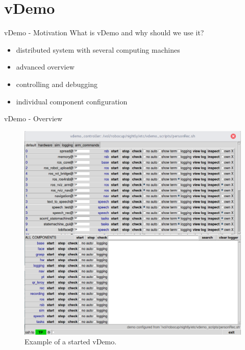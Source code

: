 \section{vDemo}

\begin{frame}[fragile]{vDemo - Motivation}
	\alert{What is vDemo and why should we use it?}
	\begin{itemize}
		\item distributed system with several computing machines
		\item advanced overview %
		\item controlling and debugging %
		\item individual component configuration 
	\end{itemize}
	
	
\end{frame}

\begin{frame}[fragile]{vDemo - Overview}
	
	\begin{figure}
		\includegraphics[scale=0.185]{vdemo_overview.png}
		\caption{Example of a started vDemo.}
	\end{figure}
	
\end{frame}


